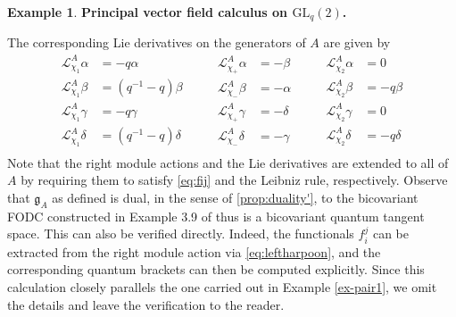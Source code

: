 \documentclass{article}
\theoremstyle{definition}
\newtheorem{example}[thm]{Example}
\begin{document}
{\begin{example} {\bf Principal vector field calculus on $\mathrm{GL}_q(2)$.}
	
	
	
	The corresponding Lie derivatives on the generators of $A$ are given by
	\begin{equation*}
		\begin{split}
			\mathscr{L}^A_{\chi_1}\alpha&=-q\alpha\\
			\mathscr{L}^A_{\chi_1}\beta&=(q^{-1}-q)\beta\\
			\mathscr{L}^A_{\chi_1}\gamma&=-q\gamma\\
			\mathscr{L}^A_{\chi_1}\delta&=(q^{-1}-q)\delta\\
		\end{split}\qquad
		\begin{split}
			\mathscr{L}^A_{\chi_+}\alpha&=-\beta\\
			\mathscr{L}^A_{\chi_-}\beta&=-\alpha\\
			\mathscr{L}^A_{\chi_+}\gamma&=-\delta\\
			\mathscr{L}^A_{\chi_-}\delta&=-\gamma\\
		\end{split}\qquad
		\begin{split}
			\mathscr{L}^A_{\chi_2}\alpha&=0\\
			\mathscr{L}^A_{\chi_2}\beta&=-q\beta\\
			\mathscr{L}^A_{\chi_2}\gamma&=0\\
			\mathscr{L}^A_{\chi_2}\delta&=-q\delta\\
		\end{split}
	\end{equation*}
	Note that the right module actions and the  Lie derivatives are extended to all of $A$ by requiring them to satisfy \eqref{eq:fij} and the Leibniz rule, respectively. Observe that $\mathfrak{g}_A$ as defined is dual, in the sense of \ref{prop:duality'}, to the bicovariant FODC constructed in Example 3.9 of \cite{aflw} thus is a bicovariant quantum tangent space. This can also be verified directly. Indeed, the functionals $f_i^{j}$ can be extracted from the right module action via \eqref{eq:leftharpoon}, and the corresponding quantum brackets can then be computed explicitly. Since this calculation closely parallels the one carried out in Example \ref{ex-pair1}, we omit the details and leave the verification to the reader.
	

\end{example}}
\end{document}
